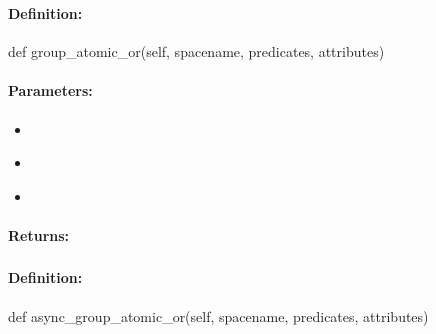\pagebreak
\subsubsection{}
\label{api:python:group_atomic_or}


\paragraph{Definition:}
\begin{pythoncode}
def group_atomic_or(self, spacename, predicates, attributes)
\end{pythoncode}

\paragraph{Parameters:}
\begin{itemize}[noitemsep]
\item {}\\

\item {}\\

\item {}\\

\end{itemize}

\paragraph{Returns:}


\pagebreak
\subsubsection{}
\label{api:python:async_group_atomic_or}


\paragraph{Definition:}
\begin{pythoncode}
def async_group_atomic_or(self, spacename, predicates, attributes)
\end{pythoncode}

